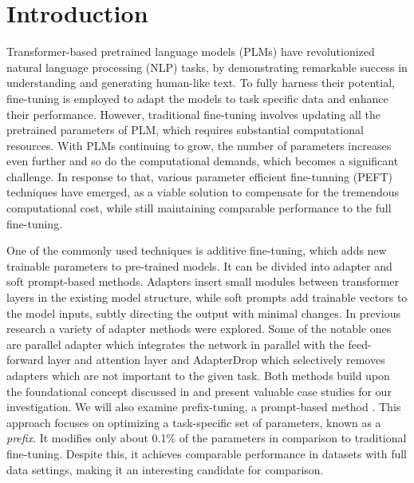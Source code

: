 \documentclass[fleqn,moreauthors,10pt]{ds_report}
\affiliation{\textit{Advisors: Aleš Žagar}}
\begin{document}
\flushbottom 

\maketitle 

\thispagestyle{empty} 


\section*{Introduction}
Transformer-based pretrained language models (PLMs) have revolutionized natural language processing (NLP) tasks, by demonstrating remarkable success in understanding and generating human-like text. To fully harness their potential, fine-tuning is employed to adapt the models to task specific data and enhance their performance. However, traditional fine-tuning involves updating all the pretrained parameters of PLM, which requires substantial computational resources. With PLMs continuing to grow, the number of parameters increases even further and so do the computational demands, which becomes a significant challenge. In response to that, various parameter efficient fine-tunning (PEFT) techniques have emerged, as a viable solution to compensate for the tremendous computational cost, while still maintaining comparable performance to the full fine-tuning.

One of the commonly used techniques is additive fine-tuning, which adds new trainable parameters to pre-trained models. It can be divided into adapter and soft prompt-based methods. Adapters insert small modules between transformer layers in the existing model structure, while soft prompts add trainable vectors to the model inputs, subtly directing the output with minimal changes. In previous research a variety of adapter methods were explored. Some of the notable ones are parallel adapter \cite{he2021towards} which integrates the network in parallel with the feed-forward layer and attention layer and AdapterDrop \cite{ruckle2020adapterdrop} which selectively removes adapters which are not important to the given task. Both methods build upon the foundational concept discussed in \cite{houlsby2019parameter} and present valuable case studies for our investigation. We will also examine prefix-tuning, a prompt-based method \cite{li2021prefix}. This approach focuses on optimizing a task-specific set of parameters, known as a \textit{prefix}. It modifies only about 0.1\% of the parameters in comparison to traditional fine-tuning. Despite this, it achieves comparable performance in datasets with full data settings, making it an interesting candidate for comparison.
\end{document}
